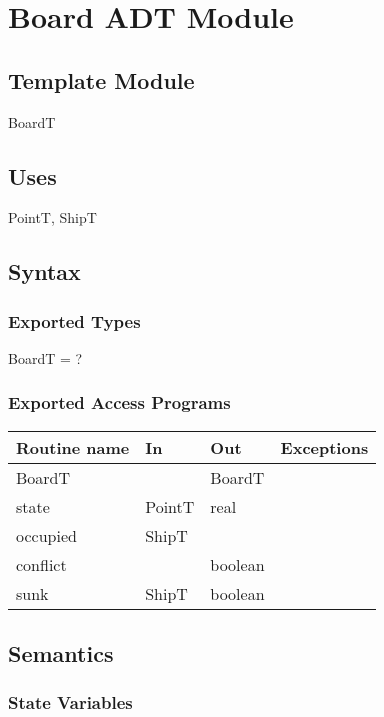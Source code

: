 \documentclass[12pt]{article}
\begin{document}
\newpage
\section* {Board ADT Module}

\subsection* {Template Module}

BoardT

\subsection* {Uses}

PointT, ShipT

\subsection* {Syntax}

\subsubsection* {Exported Types}

BoardT = ?

\subsubsection* {Exported Access Programs}

\begin{tabular}{| l | l | l | l |}
\hline
\textbf{Routine name} & \textbf{In} & \textbf{Out} & \textbf{Exceptions}\\
\hline
BoardT &  & BoardT &\\
\hline 
state & PointT & real &\\
\hline 
occupied & ShipT &  &\\
\hline 
conflict & & boolean &\\
\hline 
sunk & ShipT & boolean &\\
\hline 
\end{tabular}

\subsection* {Semantics}

\subsubsection* {State Variables}
\end{document}
